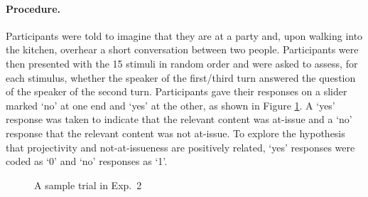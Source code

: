 \documentclass[11pt,fleqn]{article}
\newcommand{\6}{\mbox{$[\hspace*{-.6mm}[$}}
\newcommand{\9}{\mbox{$]\hspace*{-.6mm}]$}}
\begin{document}
\paragraph{Procedure.} Participants were told to imagine that they are at a party and, upon walking into the kitchen, overhear a short conversation between two people. Participants were then presented with the 15 stimuli in random order and were asked to assess, for each stimulus, whether the speaker of the first/third turn answered the question of the speaker of the second turn. Participants gave their responses on a slider marked `no' at one end and `yes' at the other, as shown in Figure \ref{f-trial-exp2a}. A `yes' response was taken to indicate that the relevant content was at-issue and a `no' response that the relevant content was not at-issue. To explore the hypothesis that projectivity and not-at-issueness are positively related, `yes' responses were coded as `0' and `no' responses as `1'. 

\begin{figure}[!h]
\begin{center}
\end{center}
\caption{A sample trial in Exp.~2}
\label{f-trial-exp2a}
\end{figure}
\end{document}
